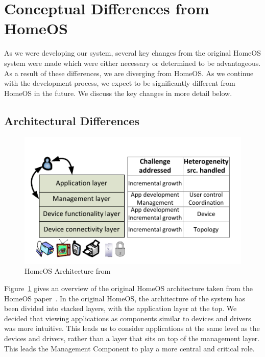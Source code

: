 \section{Conceptual Differences from HomeOS}                                                           
\label{sec:homeosdiff}
As we were developing our system, several key changes from the original HomeOS
system were made which were either necessary or determined to be advantageous.
As a result of these differences, we are diverging from HomeOS. As we continue
with the development process, we expect to be significantly different from
HomeOS in the future.  We discuss the key changes in more detail below.
\subsection{Architectural Differences}
\label{sec:archdiff} 
\begin{figure}[tbh]                                                              
    \centering                                                                   
    \includegraphics[width=1.0\columnwidth]{figs/homeosOrig.png}                     
    \caption{HomeOS Architecture from~\cite{homeOS}}                                 
    \label{Fig:homeosarch}                                                           
\end{figure}                                                                     
Figure~\ref{Fig:homeosarch} gives an overview of the original HomeOS
architecture taken from the HomeOS paper~\cite{homeOS}.
In the original HomeOS, the architecture of the system has been divided into 
stacked layers, with the application layer at the top. We decided that viewing
applications as components similar to devices and drivers was more intuitive.
This leads us to consider applications at the same level as the devices and
drivers, rather than a layer that sits on top of the management layer. This
leads the Management Component to play a more central and critical role.


